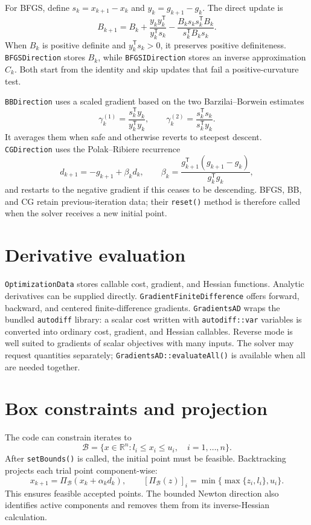 \documentclass[11pt,a4paper]{article}
\newcommand{\R}{\mathbb{R}}
\newcommand{\trans}{\mathsf{T}}
\begin{document}
For BFGS, define $s_k=x_{k+1}-x_k$ and $y_k=g_{k+1}-g_k$. The direct update is
\begin{equation}
 B_{k+1}=B_k+\frac{y_ky_k^\trans}{y_k^\trans s_k}
 -\frac{B_ks_ks_k^\trans B_k}{s_k^\trans B_ks_k}.
 \label{eq:bfgs}
\end{equation}
When $B_k$ is positive definite and $y_k^\trans s_k>0$, it preserves positive
definiteness. \texttt{BFGSDirection} stores $B_k$, while
\texttt{BFGSIDirection} stores an inverse approximation $C_k$. Both start from
the identity and skip updates that fail a positive-curvature test.

\texttt{BBDirection} uses a scaled gradient based on the two
Barzilai--Borwein estimates
\[
 \gamma_k^{(1)}=\frac{s_k^\trans y_k}{y_k^\trans y_k},\qquad
 \gamma_k^{(2)}=\frac{s_k^\trans s_k}{s_k^\trans y_k}.
\]
It averages them when safe and otherwise reverts to steepest descent.
\texttt{CGDirection} uses the Polak--Ribiere recurrence
\[
 d_{k+1}=-g_{k+1}+\beta_kd_k,\qquad
 \beta_k=\frac{g_{k+1}^\trans(g_{k+1}-g_k)}{g_k^\trans g_k},
\]
and restarts to the negative gradient if this ceases to be descending. BFGS,
BB, and CG retain previous-iteration data; their \texttt{reset()} method is
therefore called when the solver receives a new initial point.

\section{Derivative evaluation}

\texttt{OptimizationData} stores callable cost, gradient, and Hessian
functions. Analytic derivatives can be supplied directly.
\texttt{GradientFiniteDifference} offers forward, backward, and centered
finite-difference gradients. \texttt{GradientsAD} wraps the bundled
\texttt{autodiff} library: a scalar cost written with
\texttt{autodiff::var} variables is converted into ordinary cost, gradient,
and Hessian callables. Reverse mode is well suited to gradients of scalar
objectives with many inputs. The solver may request quantities separately;
\texttt{GradientsAD::evaluateAll()} is available when all are needed together.

\section{Box constraints and projection}

The code can constrain iterates to
\[
 \mathcal{B}=\{x\in\R^n:l_i\leq x_i\leq u_i,\quad i=1,\ldots,n\}.
\]
After \texttt{setBounds()} is called, the initial point must be feasible.
Backtracking projects each trial point component-wise:
\begin{equation}
 x_{k+1}=\Pi_{\mathcal B}(x_k+\alpha_kd_k),\qquad
 [\Pi_{\mathcal B}(z)]_i=\min\{\max\{z_i,l_i\},u_i\}.
 \label{eq:projection}
\end{equation}
This ensures feasible accepted points. The bounded Newton direction also
identifies active components and removes them from its inverse-Hessian
calculation.
\end{document}
